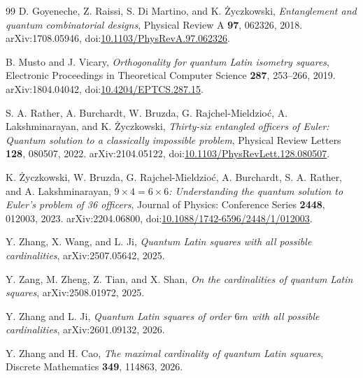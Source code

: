 \documentclass[a4paper,11pt]{article}
\begin{document}
\begin{thebibliography}{99}
D. Goyeneche, Z. Raissi, S. Di Martino, and K. \.{Z}yczkowski,
\newblock \emph{Entanglement and quantum combinatorial designs},
\newblock Physical Review A \textbf{97}, 062326, 2018.
\newblock arXiv:1708.05946, doi:\href{https://doi.org/10.1103/PhysRevA.97.062326}{10.1103/PhysRevA.97.062326}.

B. Musto and J. Vicary,
\newblock \emph{Orthogonality for quantum Latin isometry squares},
\newblock Electronic Proceedings in Theoretical Computer Science \textbf{287}, 253--266, 2019.
\newblock arXiv:1804.04042, doi:\href{https://doi.org/10.4204/EPTCS.287.15}{10.4204/EPTCS.287.15}.

S. A. Rather, A. Burchardt, W. Bruzda, G. Rajchel-Mieldzio\'c, A. Lakshminarayan, and K. \.{Z}yczkowski,
\newblock \emph{Thirty-six entangled officers of Euler: Quantum solution to a classically impossible problem},
\newblock Physical Review Letters \textbf{128}, 080507, 2022.
\newblock arXiv:2104.05122, doi:\href{https://doi.org/10.1103/PhysRevLett.128.080507}{10.1103/PhysRevLett.128.080507}.

K. \.{Z}yczkowski, W. Bruzda, G. Rajchel-Mieldzio\'c, A. Burchardt, S. A. Rather, and A. Lakshminarayan,
\newblock \emph{$9\times4=6\times6$: Understanding the quantum solution to Euler's problem of 36 officers},
\newblock Journal of Physics: Conference Series \textbf{2448}, 012003, 2023.
\newblock arXiv:2204.06800, doi:\href{https://doi.org/10.1088/1742-6596/2448/1/012003}{10.1088/1742-6596/2448/1/012003}.

Y. Zhang, X. Wang, and L. Ji,
\newblock \emph{Quantum Latin squares with all possible cardinalities},
\newblock arXiv:2507.05642, 2025.

Y. Zang, M. Zheng, Z. Tian, and X. Shan,
\newblock \emph{On the cardinalities of quantum Latin squares},
\newblock arXiv:2508.01972, 2025.

Y. Zhang and L. Ji,
\newblock \emph{Quantum Latin squares of order $6m$ with all possible cardinalities},
\newblock arXiv:2601.09132, 2026.

Y. Zhang and H. Cao,
\newblock \emph{The maximal cardinality of quantum Latin squares},
\newblock Discrete Mathematics \textbf{349}, 114863, 2026.

\end{thebibliography}
\end{document}
